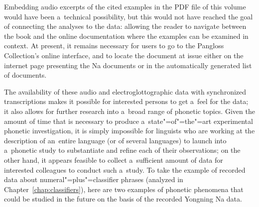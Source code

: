 Embedding audio excerpts of the cited examples in the PDF file of this volume would have been a~technical possibility, but this would not have reached the goal of connecting the analyses to the data: allowing the reader to navigate between the book and the online documentation where the examples can be examined in context. At present, it remains necessary for users to go
to the Pangloss Collection's online interface, and to locate the document at issue either on the internet page presenting the Na
documents or
in the automatically generated list of documents. 

The availability of these audio and electroglottographic data with synchronized transcriptions makes
it possible for interested persons to get a~feel for the data; it also allows for
further research into a~broad range of phonetic topics. Given the amount of time that is necessary
to produce a~state"=of"=the"=art experimental phonetic investigation, it is simply impossible for
linguists who are working at the description of an~entire language (or of several languages) to
launch into a~phonetic study to substantiate and refine each of their observations; on the other
hand, it appears feasible to collect a~sufficient amount of data for interested colleagues to
conduct such a~study. To take the example of recorded data about {numeral}"=plus"=classifier phrases
(analyzed in Chapter~\ref{chap:classifiers}), here are two examples of phonetic phenomena that could be studied in the future
on the basis of the recorded Yongning Na data.





